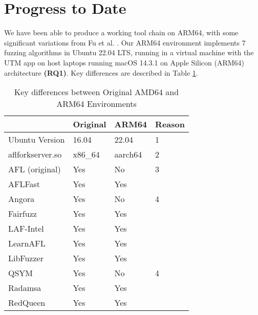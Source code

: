 \section{Progress to Date}
We have been able to produce a working tool chain on ARM64, with some significant variations
from Fu et al. \cite{Fu}. Our ARM64 environment implements 7 fuzzing algorithms in
Ubuntu 22.04 LTS, running in a virtual machine with the UTM app on host laptops running
macOS 14.3.1 on Apple Silicon (ARM64) architecture \textbf{(RQ1)}. Key differences are
described in Table \ref{arm64-characteristics}.

\begin{table}[ht]
    \begin{tabular}{|l|l|l|l|}
        \hline
                        & Original\cite{Fu} & ARM64 & Reason \\
        \hline
        Ubuntu Version  & 16.04             & 22.04 & 1 \\
        \hline
        aflforkserver.so    & x86\_64           & aarch64 & 2 \\
        \hline
        AFL (original)  & Yes               & No & 3 \\
        \hline
        AFLFast         & Yes               & Yes & \\
        \hline
        Angora          & Yes               & No & 4 \\
        \hline
        Fairfuzz        & Yes               & Yes & \\
        \hline
        LAF-Intel       & Yes               & Yes & \\
        \hline
        LearnAFL        & Yes               & Yes & \\
        \hline
        LibFuzzer       & Yes               & Yes & \\
        \hline
        QSYM            & Yes               & No & 4 \\
        \hline
        Radamsa         & Yes               & Yes & \\
        \hline
        RedQueen        & Yes               & Yes & \\
        \hline
    \end{tabular}
    \caption{Key differences between Original AMD64 and ARM64 Environments}
    \label{arm64-characteristics}
\end{table}

